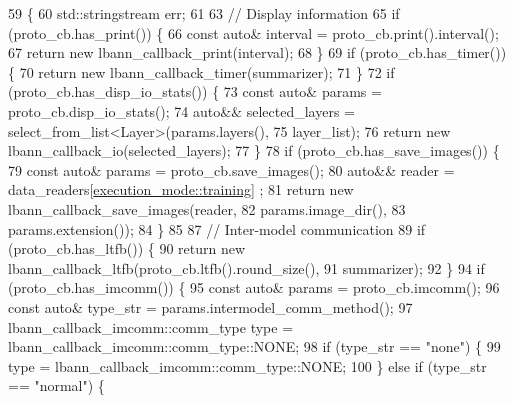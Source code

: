 \begin{DoxyCode}
59                                                               \{
60   std::stringstream err;
61 
63   \textcolor{comment}{// Display information}
65 \textcolor{comment}{}  \textcolor{keywordflow}{if} (proto\_cb.has\_print()) \{
66     \textcolor{keyword}{const} \textcolor{keyword}{auto}& interval = proto\_cb.print().interval();
67     \textcolor{keywordflow}{return} \textcolor{keyword}{new} lbann\_callback\_print(interval);
68   \}
69   \textcolor{keywordflow}{if} (proto\_cb.has\_timer()) \{
70     \textcolor{keywordflow}{return} \textcolor{keyword}{new} lbann\_callback\_timer(summarizer);
71   \}
72   \textcolor{keywordflow}{if} (proto\_cb.has\_disp\_io\_stats()) \{
73     \textcolor{keyword}{const} \textcolor{keyword}{auto}& params = proto\_cb.disp\_io\_stats();
74     \textcolor{keyword}{auto}&& selected\_layers = select\_from\_list<Layer>(params.layers(),
75                                                      layer\_list);
76     \textcolor{keywordflow}{return} \textcolor{keyword}{new} lbann\_callback\_io(selected\_layers);
77   \}
78   \textcolor{keywordflow}{if} (proto\_cb.has\_save\_images()) \{
79     \textcolor{keyword}{const} \textcolor{keyword}{auto}& params = proto\_cb.save\_images();
80     \textcolor{keyword}{auto}&& reader = data\_readers[\hyperlink{base_8hpp_a2781a159088df64ed7d47cc91c4dc0a8ac185ddac8b5a8f5aa23c5b80bc12d214}{execution\_mode::training}] ;
81     \textcolor{keywordflow}{return} \textcolor{keyword}{new} lbann\_callback\_save\_images(reader,
82                                           params.image\_dir(),
83                                           params.extension());
84   \}
85 
87   \textcolor{comment}{// Inter-model communication}
89 \textcolor{comment}{}  \textcolor{keywordflow}{if} (proto\_cb.has\_ltfb()) \{
90     \textcolor{keywordflow}{return} \textcolor{keyword}{new} lbann\_callback\_ltfb(proto\_cb.ltfb().round\_size(),
91                                    summarizer);
92   \}  
94   \textcolor{keywordflow}{if} (proto\_cb.has\_imcomm()) \{
95     \textcolor{keyword}{const} \textcolor{keyword}{auto}& params = proto\_cb.imcomm();
96     \textcolor{keyword}{const} \textcolor{keyword}{auto}& type\_str = params.intermodel\_comm\_method();
97     lbann\_callback\_imcomm::comm\_type type = lbann\_callback\_imcomm::comm\_type::NONE;
98     \textcolor{keywordflow}{if} (type\_str == \textcolor{stringliteral}{"none"}) \{
99       type = lbann\_callback\_imcomm::comm\_type::NONE;
100     \} \textcolor{keywordflow}{else} \textcolor{keywordflow}{if} (type\_str == \textcolor{stringliteral}{"normal"}) \{

\end{DoxyCode}

